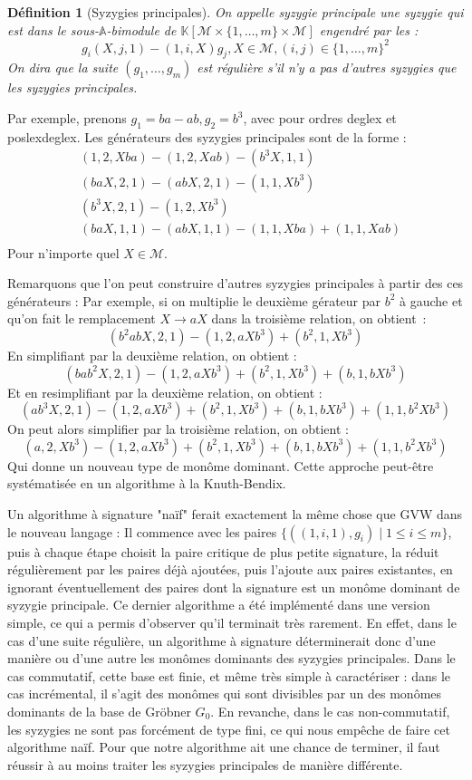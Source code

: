 \documentclass{article}
\newtheorem*{dfn}{Définition}
\newcommand{\K}{\mathbb{K}}
\newcommand{\A}{\mathbb{A}}
\newcommand{\M}{\mathcal{M}}
\newcommand{\CR}{\K[\M\times\{1, \dots, m\}\times\M]}
\begin{document}
\begin{dfn}[Syzygies principales]
	On appelle syzygie principale une syzygie qui est dans le sous-$\A$-bimodule de $\CR$ engendré par les :
	$$g_i(X, j, 1) - (1, i, X)g_j, X \in \M, (i, j) \in \{1, \dots, m\}^2$$
	On dira que la suite $(g_1, \dots, g_m)$ est régulière s'il n'y a pas d'autres syzygies que les syzygies principales.
	
\end{dfn}

Par exemple, prenons $g_1 = ba - ab, g_2 = b^3$, avec pour ordres deglex et poslexdeglex.
Les générateurs des syzygies principales sont de la forme :
\begin{align*}
& (1, 2, Xba) - (1, 2, Xab) - (b^3X, 1, 1) \\
& (baX, 2, 1) - (abX, 2, 1) - (1, 1, Xb^3) \\
& (b^3X, 2, 1) - (1, 2, Xb^3) \\
& (baX, 1, 1) - (abX, 1, 1) - (1, 1, Xba) + (1, 1, Xab) \\
\end{align*}
Pour n'importe quel $X \in \M$.

Remarquons que l'on peut construire d'autres syzygies principales à partir des ces générateurs :
Par exemple, si on multiplie le deuxième gérateur par $b^2$ à gauche et qu'on fait le remplacement $X \rightarrow aX$ dans la troisième relation, on obtient~:
$$(b^2abX, 2, 1) - (1, 2, aXb^3) + (b^2, 1, Xb^3) $$
En simplifiant par la deuxième relation, on obtient :
$$(bab^2X, 2, 1) - (1, 2, aXb^3) + (b^2, 1, Xb^3) + (b, 1, bXb^3)$$
Et en resimplifiant par la deuxième relation, on obtient :
$$(ab^3X, 2, 1) - (1, 2, aXb^3) + (b^2, 1, Xb^3) + (b, 1, bXb^3) + (1, 1, b^2Xb^3)$$
On peut alors simplifier par la troisième relation, on obtient :
$$(a, 2, Xb^3) - (1, 2, aXb^3) + (b^2, 1, Xb^3) + (b, 1, bXb^3) + (1, 1, b^2Xb^3)$$
Qui donne un nouveau type de monôme dominant. Cette approche peut-être systématisée en un algorithme à la Knuth-Bendix.

Un algorithme à signature "naïf" ferait exactement la même chose que GVW dans le nouveau langage :
Il commence avec les paires $\{((1, i, 1), g_i) \;|\; 1 \leq i \leq m\}$, puis à chaque étape choisit la paire critique de plus petite signature, la réduit régulièrement par les paires déjà ajoutées, puis l'ajoute aux paires existantes, en ignorant éventuellement des paires dont la signature est un monôme dominant de syzygie principale. Ce dernier algorithme a été implémenté dans une version simple, ce qui a permis d'observer qu'il terminait très rarement.
En effet, dans le cas d'une suite régulière, un algorithme à signature déterminerait donc d'une manière ou d'une autre les monômes dominants des syzygies principales. Dans le cas commutatif, cette base est finie, et même très simple à caractériser : dans le cas incrémental, il s'agit des monômes qui sont divisibles par un des monômes dominants de la base de Gröbner $G_0$.
En revanche, dans le cas non-commutatif, les syzygies ne sont pas forcément de type fini, ce qui nous empêche de faire cet algorithme naïf. Pour que notre algorithme ait une chance de terminer, il faut réussir à au moins traiter les syzygies principales de manière différente.
\end{document}
